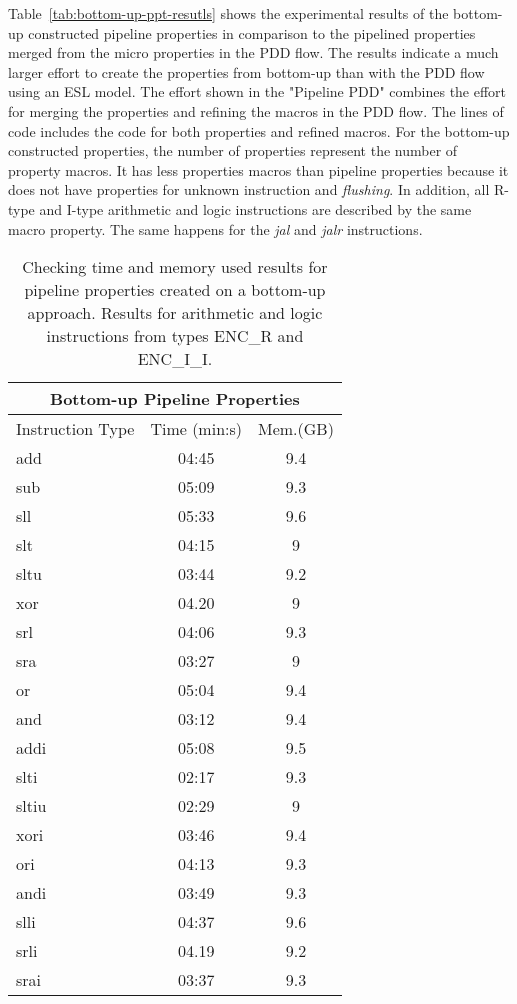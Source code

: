 Table~\ref{tab:bottom-up-ppt-resutls} shows the experimental results of the bottom-up constructed pipeline properties in comparison to the pipelined properties merged from the micro properties in the PDD flow. The results indicate a much larger effort to create the properties from bottom-up than with the PDD flow using an ESL model. The effort shown in the "Pipeline PDD" combines the effort for merging the properties and refining the macros in the PDD flow. The lines of code includes the code for both properties and refined macros. For the bottom-up constructed properties, the number of properties represent the number of property macros. It has less properties macros than pipeline properties because it does not have properties for unknown instruction and \textit{flushing}. In addition, all R-type and I-type arithmetic and logic instructions are described by the same macro property. The same happens for the \textit{jal} and \textit{jalr} instructions. 


\begin{table*}[htb!] 
	\centering 
	\caption{Checking time and memory used results for pipeline properties created on a bottom-up approach. Results for arithmetic and logic instructions from types ENC\_R and ENC\_I\_I.} 
	\label{tab:bottom-up-check-resutls-arithm}
		\begin{tabular}{p{4cm}cc}
          \multicolumn{3}{c}{\textbf{Bottom-up Pipeline Properties}} \\
          \hline
         Instruction Type & Time (min:s) & Mem.(GB)  \\
          \hline
        add     & 04:45 & 9.4  \\
        sub    & 05:09 & 9.3 \\
        sll     & 05:33 & 9.6 \\
        slt    & 04:15 & 9 \\
        sltu    & 03:44 & 9.2 \\
        xor    & 04.20 & 9 \\
        srl    & 04:06 & 9.3 \\
        sra    & 03:27 & 9 \\
        or    & 05:04 & 9.4 \\
        and    & 03:12 & 9.4 \\
        addi    & 05:08 & 9.5 \\
        slti    & 02:17 & 9.3 \\
        sltiu    & 02:29 & 9 \\
        xori    & 03:46 & 9.4 \\
        ori    & 04:13 & 9.3 \\
        andi    & 03:49 & 9.3 \\
        slli    & 04:37 & 9.6 \\
        srli    & 04.19 & 9.2 \\
        srai    & 03:37 & 9.3 \\
\end{tabular}
\end{table*}

